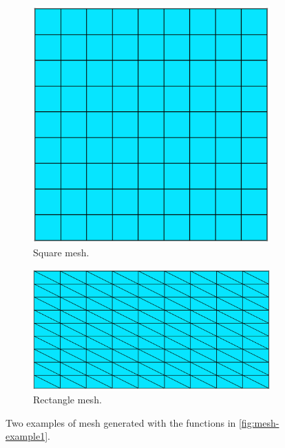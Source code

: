 \documentclass[headings=standardclasses, abstract=true]{scrartcl}
\begin{document}
\begin{figure}[H]
    \centering
    \hfill
    \begin{subfigure}[c]{0.4\textwidth}
        \centering
        \includegraphics[width=\textwidth]{figures/square_mesh.png}

        \caption{Square mesh.}
        \label{fig:square}
    \end{subfigure}
    \hspace{0.1\textwidth}
    \begin{subfigure}[c]{0.4\textwidth}
        \centering
        \includegraphics[width=\textwidth]{figures/rectangle_mesh.png}
        \caption{Rectangle mesh.}
        \label{fig:rectangle}
    \end{subfigure}
    \caption{Two examples of mesh generated with the functions in \autoref{fig:mesh-example1}.}
    \label{fig:mesh}
    \hfill
\end{figure}
\end{document}
